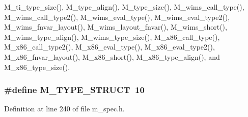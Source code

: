 M\_\-ti\_\-type\_\-size(), M\_\-type\_\-align(), M\_\-type\_\-size(), M\_\-wims\_\-call\_\-type(), M\_\-wims\_\-call\_\-type2(), M\_\-wims\_\-eval\_\-type(), M\_\-wims\_\-eval\_\-type2(), M\_\-wims\_\-fnvar\_\-layout(), M\_\-wims\_\-layout\_\-fnvar(), M\_\-wims\_\-short(), M\_\-wims\_\-type\_\-align(), M\_\-wims\_\-type\_\-size(), M\_\-x86\_\-call\_\-type(), M\_\-x86\_\-call\_\-type2(), M\_\-x86\_\-eval\_\-type(), M\_\-x86\_\-eval\_\-type2(), M\_\-x86\_\-fnvar\_\-layout(), M\_\-x86\_\-short(), M\_\-x86\_\-type\_\-align(), and M\_\-x86\_\-type\_\-size().
\subsubsection{\setlength{\rightskip}{0pt plus 5cm}\#define M\_\-TYPE\_\-STRUCT~10}\label{m__spec_8h_9a7759ceed27fb6123fc0cbd2baaf3bb}




Definition at line 240 of file m\_\-spec.h.

